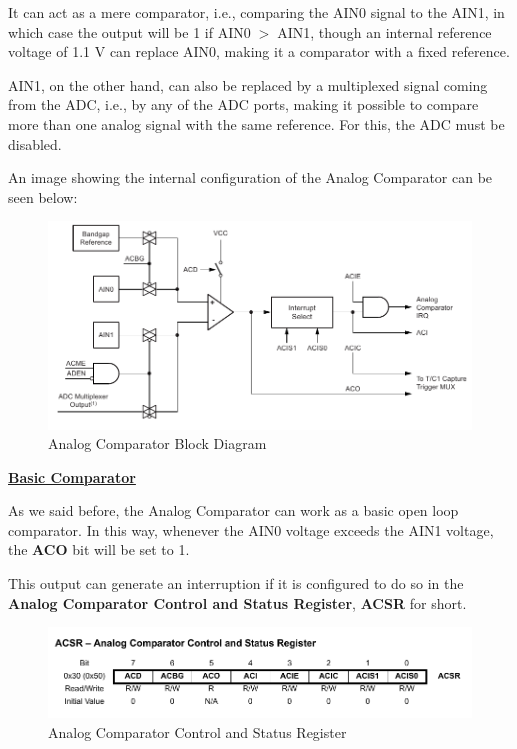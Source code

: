 It can act as a mere comparator, i.e., comparing the AIN0 signal to the AIN1, in which case the output will be 1 if AIN0$\; > \;$AIN1, though an internal reference voltage of 1.1 V can replace AIN0, making it a comparator with a fixed reference.\medskip

AIN1, on the other hand, can also be replaced by a multiplexed signal coming from the ADC, i.e., by any of the ADC ports, making it possible to compare more than one analog signal with the same reference. For this, the ADC must be disabled.\medskip

An image showing the internal configuration of the Analog Comparator can be seen below:

\begin{figure}[H]
    \centering
    \includegraphics[width = \textwidth]{Graphics/MICROS/Practice 3/DATASHEET/AC_BLOCK_DIAGRAM.pdf}
    \caption{Analog Comparator Block Diagram~\autocite{ATMEGA328P}}
    \label{fig:AC_BLOCK_DIAGRAM}
\end{figure}

\clearpage

\medskip
\underline{\textbf{Basic Comparator}}
\medskip

As we said before, the Analog Comparator can work as a basic open loop comparator. In this way, whenever the AIN0 voltage exceeds the AIN1 voltage, the \textbf{ACO} bit will be set to 1.\medskip

This output can generate an interruption if it is configured to do so in the \textbf{Analog Comparator Control and Status Register}, \textbf{ACSR} for short. 

\begin{figure}[H]
    \centering
    \includegraphics[width = \textwidth]{Graphics/MICROS/Practice 3/DATASHEET/ACSR.pdf}
    \caption{Analog Comparator Control and Status Register~\autocite{ATMEGA328P}}
    \label{fig:ACSR}
\end{figure}


